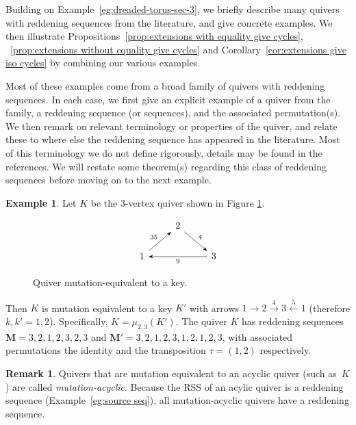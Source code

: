 \documentclass[11pt, letterpaper]{amsart}
\theoremstyle{definition}
\newtheorem{remark}[theorem]{Remark}
\newtheorem{example}[theorem]{Example}
\numberwithin{equation}{section}
\begin{document}
Building on Example~\ref{eg:dreaded-torus-sec-3}, we briefly describe many quivers with reddening sequences from the literature, and give concrete examples.
We then illustrate Propositions~\ref{prop:extensions with equality give cycles}, ~\ref{prop:extensions without equality give cycles} and Corollary~\ref{cor:extensions give iso cycles} by combining our various examples.

Most of these examples come from a broad family of quivers with reddening sequences. In each case, we first give an explicit example of a quiver from the family, a reddening sequence (or sequences), and the associated permutation(s). 
We then remark on relevant terminology or properties of the quiver, and relate these to where else the reddening sequence has appeared in the literature.
Most of this terminology we do not define rigorously, details may be found in the references.
We will restate some theorem(s) regarding this class of reddening sequences before moving on to the next example.


\begin{example}
\label{eg:keyRed}
Let $K$ be the $3$-vertex quiver shown in Figure \ref{fig:first example}.
\begin{figure}[ht]
    \centering
    \[\begin{tikzcd}[every arrow/.append style = {-{Stealth}}]
         & 2 & \\
        1 &  & 3 
        \arrow[from=2-1,to=1-2,"35"]
        \arrow[from=1-2,to=2-3,"4"]
        \arrow[from=2-3,to=2-1,"9"]
    \end{tikzcd}\]
    \caption{Quiver mutation-equivalent to a key.}
    \label{fig:first example}
\end{figure}

Then $K$ is mutation equivalent to a key $K'$ with arrows $1 \rightarrow 2 \stackrel{4}{\rightarrow} 3 \stackrel{5}{\leftarrow} 1$ (therefore $k,k' = 1,2$).
Specifically, $ K = \mu_{2,3}(K').$
The quiver $K$ has reddening sequences $\mathbf{M} = 3,2,1,2,3,2,3$ and $\mathbf{M}' = 3,2,1,2,3,1,2,1,2,3$, with associated permutations the identity and the transposition $\tau = (1,2)$ respectively.
\end{example}

\begin{remark}
Quivers that are mutation equivalent to an acyclic quiver (such as~$K$) are called \emph{mutation-acyclic}.
Because the RSS of an acylic quiver is a reddening sequence (Example~\ref{eg:source seq}), all mutation-acyclic quivers have a reddening sequence.
\end{remark}
\end{document}
